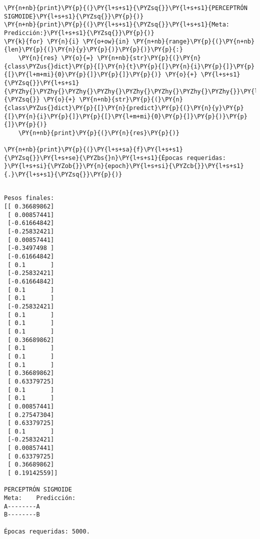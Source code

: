 \begin{tcolorbox}[breakable, size=fbox, boxrule=1pt, pad at break*=1mm,colback=cellbackground, colframe=cellborder]
\begin{Verbatim}[commandchars=\\\{\}]
\PY{n+nb}{print}\PY{p}{(}\PY{l+s+s1}{\PYZsq{}}\PY{l+s+s1}{PERCEPTRÓN SIGMOIDE}\PY{l+s+s1}{\PYZsq{}}\PY{p}{)}
\PY{n+nb}{print}\PY{p}{(}\PY{l+s+s1}{\PYZsq{}}\PY{l+s+s1}{Meta:    Predicción:}\PY{l+s+s1}{\PYZsq{}}\PY{p}{)}
\PY{k}{for} \PY{n}{i} \PY{o+ow}{in} \PY{n+nb}{range}\PY{p}{(}\PY{n+nb}{len}\PY{p}{(}\PY{n}{y}\PY{p}{)}\PY{p}{)}\PY{p}{:}
    \PY{n}{res} \PY{o}{=} \PY{n+nb}{str}\PY{p}{(}\PY{n}{class\PYZus{}dict}\PY{p}{[}\PY{n}{t}\PY{p}{[}\PY{n}{i}\PY{p}{]}\PY{p}{[}\PY{l+m+mi}{0}\PY{p}{]}\PY{p}{]}\PY{p}{)} \PY{o}{+} \PY{l+s+s1}{\PYZsq{}}\PY{l+s+s1}{\PYZhy{}\PYZhy{}\PYZhy{}\PYZhy{}\PYZhy{}\PYZhy{}\PYZhy{}\PYZhy{}}\PY{l+s+s1}{\PYZsq{}} \PY{o}{+} \PY{n+nb}{str}\PY{p}{(}\PY{n}{class\PYZus{}dict}\PY{p}{[}\PY{n}{predict}\PY{p}{(}\PY{n}{y}\PY{p}{[}\PY{n}{i}\PY{p}{]}\PY{p}{[}\PY{l+m+mi}{0}\PY{p}{]}\PY{p}{)}\PY{p}{]}\PY{p}{)}
    \PY{n+nb}{print}\PY{p}{(}\PY{n}{res}\PY{p}{)}

\PY{n+nb}{print}\PY{p}{(}\PY{l+s+sa}{f}\PY{l+s+s1}{\PYZsq{}}\PY{l+s+se}{\PYZbs{}n}\PY{l+s+s1}{Épocas requeridas: }\PY{l+s+si}{\PYZob{}}\PY{n}{epoch}\PY{l+s+si}{\PYZcb{}}\PY{l+s+s1}{.}\PY{l+s+s1}{\PYZsq{}}\PY{p}{)}
\end{Verbatim}
\end{tcolorbox}

    \begin{Verbatim}[commandchars=\\\{\}]

Pesos finales:
[[ 0.36689862]
 [ 0.00857441]
 [-0.61664842]
 [-0.25832421]
 [ 0.00857441]
 [-0.3497498 ]
 [-0.61664842]
 [ 0.1       ]
 [-0.25832421]
 [-0.61664842]
 [ 0.1       ]
 [ 0.1       ]
 [-0.25832421]
 [ 0.1       ]
 [ 0.1       ]
 [ 0.1       ]
 [ 0.36689862]
 [ 0.1       ]
 [ 0.1       ]
 [ 0.1       ]
 [ 0.36689862]
 [ 0.63379725]
 [ 0.1       ]
 [ 0.1       ]
 [ 0.00857441]
 [ 0.27547304]
 [ 0.63379725]
 [ 0.1       ]
 [-0.25832421]
 [ 0.00857441]
 [ 0.63379725]
 [ 0.36689862]
 [ 0.19142559]]

PERCEPTRÓN SIGMOIDE
Meta:    Predicción:
A--------A
B--------B

Épocas requeridas: 5000.
    \end{Verbatim}

